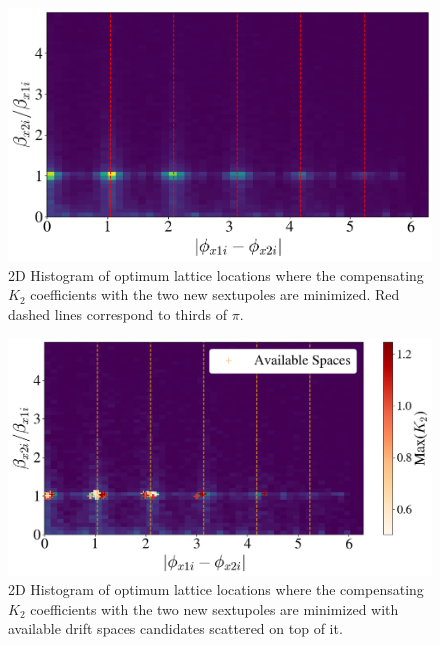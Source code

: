 \begin{figure}[H]
    \centering
    \includegraphics[width=\columnwidth]{chapter4/constrain1.png}
    \caption{2D Histogram of optimum lattice locations where the compensating $K_2$ coefficients with the two new sextupoles are minimized. Red dashed lines correspond to thirds of $\pi$.}
    \label{fig:add2c1}
\end{figure}

\begin{figure}[H]
    \centering
    \includegraphics[width=\columnwidth]{chapter4/constrain1_avail.png}
    \caption{2D Histogram of optimum lattice locations where the compensating $K_2$ coefficients with the two new sextupoles are minimized with available drift spaces candidates scattered on top of it.}
    \label{fig:add2c2}
\end{figure}

